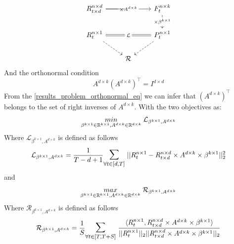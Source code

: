 \begin{equation} \label{results_problem_lfm_diagram}
\begin{tikzcd}
R^{n\times d}_{t \times d} \arrow[rr, "\times A^{d\times k}" description] \arrow[r, no head]& {}& F^{n\times k}_{t} \arrow[d, "\times \beta^{k\times 1}" description] \\
R^{n\times 1}_t \arrow[rr, "\mathcal{L}" description, Rightarrow, no head] \arrow[rd, dashed] && P^{n \times 1}_{t} \arrow[ld, dashed]\\
& \mathcal{R} &
\end{tikzcd}
\end{equation}
\newline
And the orthonormal condition
\begin{equation} \label{results_problem_orthonormal_eq}
 A^{d\times k}(A^{d\times k})^{\top} = I^{d\times d}
\end{equation}
From the \ref{results_problem_orthonormal_eq} we can infer that $(A^{d\times k})^\top$ belongs to the set of right inverses of $A^{d\times k}$. 
\newline With the two objectives as:
\begin{equation} \label{problem_lfm_loss}
\underset{\beta^{k \times 1}\in \mathbb{R}^{k\times 1}, A^{d\times k} \in \mathbb{R}^{d\times k}}{min}\hspace{1mm} \mathcal{L}_{\beta^{k \times 1}, A^{d\times k}}
\end{equation}
Where $\mathcal{L}_{\beta^{k \times 1}, A^{d\times k}}$ is defined as follows
\begin{equation} \label{problem_lfm_loss_exprr}
\mathcal{L}_{\beta^{k \times 1}, A^{d\times k}} = \frac{1}{T-d+1} \mathlarger{\mathlarger{\sum}}_{\forall t\in [d,T]} \hspace{1mm} ||R^{n\times 1}_t-R^{n\times d}_{t\times d}\times A^{d\times k} \times \beta^{k \times 1}||_2^2
\end{equation}
and 
\begin{equation} \label{problem_lfm_reward}
\underset{\beta^{k \times 1}\in \mathbb{R}^{k\times 1}, A^{d\times k} \in \mathbb{R}^{d\times k}}{max}\hspace{1mm} \mathcal{R}_{\beta^{k \times 1}, A^{d\times k}}
\end{equation}
Where $\mathcal{R}_{\beta^{k \times 1}, A^{d\times k}}$ is defined as follows
\begin{equation} \label{problem_lfm_reward_exprr}
\mathcal{R}_{\beta^{k \times 1}, A^{d\times k}} = \frac{1}{S} \mathlarger{\mathlarger{\sum}}_{\forall t\in [T,T+S]} \hspace{1mm} \frac{\langle R^{n\times 1}_t,R^{n\times d}_{t\times d}\times A^{d\times k} \times \beta^{k \times 1}\rangle}{||R^{n\times 1}_t||_2||R^{n\times d}_{t\times d}\times A^{d\times k} \times \beta^{k \times 1}||_2}
\end{equation}
